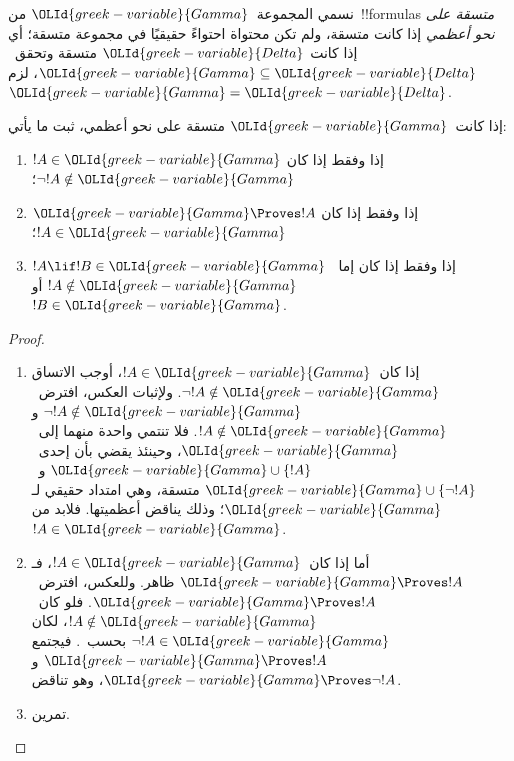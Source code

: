 \documentclass[../../../include/open-logic-section]{subfiles}
\begin{document}


\begin{defn}
نسمي المجموعة~$\OLId{greek-variable}{Gamma}$ من~!!{formula}s \emph{متسقة على نحو أعظمي} إذا
كانت متسقة، ولم تكن محتواة احتواءً حقيقيًا في مجموعة متسقة؛ أي إذا كانت
$\OLId{greek-variable}{Delta}$ متسقة وتحقق~$\OLId{greek-variable}{Gamma}\subseteq\OLId{greek-variable}{Delta}$، لزم~$\OLId{greek-variable}{Gamma}=\OLId{greek-variable}{Delta}$.
\end{defn}

\begin{lem}[لمّة الصدق]
إذا كانت~$\OLId{greek-variable}{Gamma}$ متسقة على نحو أعظمي، ثبت ما يأتي:
\begin{enumerate}
\item {} $!A\in\OLId{greek-variable}{Gamma}$ إذا وفقط إذا كان
  $\lnot !A\notin\OLId{greek-variable}{Gamma}$؛
\item {} $\OLId{greek-variable}{Gamma}\Proves !A$ إذا وفقط إذا كان
  $!A\in\OLId{greek-variable}{Gamma}$؛
\item {} $!A\lif !B\in\OLId{greek-variable}{Gamma}$ إذا وفقط إذا كان
  إما~$!A\notin\OLId{greek-variable}{Gamma}$ أو~$!B\in\OLId{greek-variable}{Gamma}$.
\end{enumerate}
\end{lem}

\begin{proof}
\begin{enumerate}
\item إذا كان~$!A\in\OLId{greek-variable}{Gamma}$، أوجب الاتساق
  $\lnot !A\notin\OLId{greek-variable}{Gamma}$. ولإثبات العكس، افترض~$\lnot !A\notin\OLId{greek-variable}{Gamma}$
  و$!A\notin\OLId{greek-variable}{Gamma}$. فلا تنتمي واحدة منهما إلى~$\OLId{greek-variable}{Gamma}$، وحينئذ يقضي
   بأن إحدى~$\OLId{greek-variable}{Gamma}\cup\{!A\}$
  و~$\OLId{greek-variable}{Gamma}\cup\{\lnot !A\}$ متسقة، وهي امتداد حقيقي لـ$\OLId{greek-variable}{Gamma}$؛ وذلك
  يناقض أعظميتها. فلابد من~$!A\in\OLId{greek-variable}{Gamma}$.
\item أما إذا كان~$!A\in\OLId{greek-variable}{Gamma}$، فـ$\OLId{greek-variable}{Gamma}\Proves !A$ ظاهر. وللعكس،
  افترض~$\OLId{greek-variable}{Gamma}\Proves !A$. فلو كان~$!A\notin\OLId{greek-variable}{Gamma}$، لكان
  $\lnot !A\in\OLId{greek-variable}{Gamma}$ بحسب~. فيجتمع
  $\OLId{greek-variable}{Gamma}\Proves !A$ و$\OLId{greek-variable}{Gamma}\Proves\lnot !A$، وهو تناقض.
\item تمرين.
\end{enumerate}
\end{proof}
\end{document}
